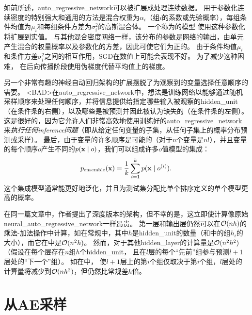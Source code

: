 如前所述，\gls{auto_regressive_network}可以被扩展成处理连续数据。
用于参数化连续密度的特别强大和通用的方法是混合权重为$\alpha_i$（组$i$的系数或先验概率），每组条件均值为$\mu_i$和每组条件方差为$\sigma_i^2$的高斯混合体。
一个称为的模型\citep{Benigno-et-al-NIPS2013-small} 使用这种参数化将扩展到实值。
与其他混合密度网络一样，该分布的参数是网络的输出，由单元产生混合的权量概率以及参数化的方差，因此可使它们为正的。
由于条件均值$\mu_i$和条件方差$\sigma_i^2$之间的相互作用，\gls{SGD}在数值上可能会表现不好。
为了减少这种困难， \citet{Benigno-et-al-NIPS2013-small}在后向传播阶段使用伪梯度代替平均值上的梯度。

另一个非常有趣的神经自动回归架构的扩展摆脱了为观察到的变量选择任意顺序的需要\citep{Uria+al-ICML2014}。
<BAD>在\gls{auto_regressive_network}中，想法是训练网络以能够通过随机采样顺序来处理任何顺序，并将信息提供给指定哪些输入被观察的\gls{hidden_unit}（在条件条的右侧），以及哪些是被预测并因此被认为缺失的（在条件条的左侧）。
这是很好的，因为它允许人们非常高效地使用训练好的\gls{auto_regressive_network}来\emph{执行任何\gls{inference}问题}（即从给定任何变量的子集，从任何子集上的概率分布预测或采样）。
最后，由于变量的许多顺序是可能的（对于$n$个变量是$n!$），并且变量的每个顺序$o$产生不同的$p(\mathbf{x} \mid o)$，我们可以组成许多$o$值模型的集成：
\begin{align}
 p_{\text{ensemble}}(\mathbf{x}) = \frac{1}{k} \sum_{i=1}^k p(\mathbf{x}  \mid  o^{(i)}).
\end{align}
这个集成模型通常能更好地泛化，并且为测试集分配比单个排序定义的单个模型更高的概率。


在同一篇文章中，作者提出了深度版本的架构，但不幸的是，这立即使计算像原始\gls{neural_auto_regressive_network}一样昂贵\citep{Bengio+Bengio-NIPS2000}。
第一层和输出层仍然可以在$\mathcal{O}(nh)$的乘法-加法操作中计算，如在常规中，其中$h$是\gls{hidden_unit}的数量（和中的组$h_i$的大小），而它在\citet{Bengio+Bengio-NIPS2000}中是$\mathcal{O}(n^2h)$。
然而，对于其他\gls{hidden_layer}的计算量是$\mathcal{O}(n^2 h^2)$（假设在每个层存在$n$组$h$个\gls{hidden_unit}， 且在$l$层的每个``先前''组参与预测$l+1$层处的``下一个''组）。
如在\citet{Uria+al-ICML2014}中， 使$l+1$层上的第$i$个组仅取决于第$i$个组，$l$层处的计算量将减少到$\mathcal{O}(nh^2)$，但仍然比常规差$h$倍。


\section{从\gls{AE}采样}
\label{sec:drawing_samples_from_autoencoders}

